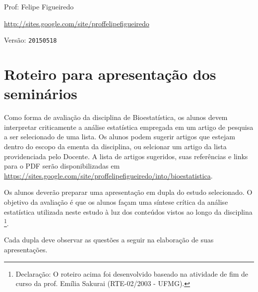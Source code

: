 \documentclass[a4paper]{article}
\begin{document}
\parbox[c]{.825\textwidth}{\raggedright%
{Prof: Felipe Figueiredo\par}
{\url{http://sites.google.com/site/proffelipefigueiredo}\par}
}

Versão: \verb|20150518|




\section{Roteiro para apresentação dos seminários}

Como forma de avaliação da disciplina de Bioestatística, os alunos
devem interpretar criticamente a análise estatística empregada em um
artigo de pesquisa a ser selecionado de uma lista. Os alunos podem
sugerir artigos que estejam dentro do escopo da ementa da disciplina,
ou selcionar um artigo da lista providenciada pelo Docente. A lista de
artigos sugeridos, suas referências e links para o PDF serão
disponibilizadas em
\url{https://sites.google.com/site/proffelipefigueiredo/into/bioestatistica}.

Os alunos deverão preparar uma apresentação em dupla do estudo
selecionado. O objetivo da avaliação é que os alunos façam uma síntese
crítica da análise estatística utilizada neste estudo à luz dos
conteúdos vistos ao longo da disciplina \footnote{Declaração: O
  roteiro acima foi desenvolvido baseado na atividade de fim de curso
  da prof. Emília Sakurai (RTE-02/2003 - UFMG).}.

Cada dupla deve observar as questões a seguir na elaboração de suas
apresentações.
\end{document}
